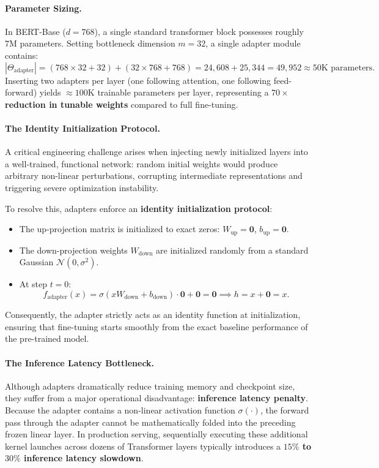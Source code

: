 \documentclass[../../../main.tex]{subfiles}
\begin{document}
\paragraph{Parameter Sizing.}
In BERT-Base ($d = 768$), a single standard transformer block possesses roughly $7\text{M}$ parameters. Setting bottleneck dimension $m = 32$, a single adapter module contains:
\begin{equation}
\label{eq:adapter_parameter_count}
|\Theta_{\text{adapter}}| = (768 \times 32 + 32) + (32 \times 768 + 768) = 24{,}608 + 25{,}344 = 49{,}952 \approx 50\text{K parameters}.
\end{equation}
Inserting two adapters per layer (one following attention, one following feed-forward) yields $\approx 100\text{K}$ trainable parameters per layer, representing a \textbf{$70\times$ reduction in tunable weights} compared to full fine-tuning.

\paragraph{The Identity Initialization Protocol.}
A critical engineering challenge arises when injecting newly initialized layers into a well-trained, functional network: random initial weights would produce arbitrary non-linear perturbations, corrupting intermediate representations and triggering severe optimization instability.

To resolve this, adapters enforce an \textbf{identity initialization protocol}:
\begin{itemize}
    \item The up-projection matrix is initialized to exact zeros: $W_{\text{up}} = \mathbf{0}$, $b_{\text{up}} = \mathbf{0}$.
    \item The down-projection weights $W_{\text{down}}$ are initialized randomly from a standard Gaussian $\mathcal{N}(0, \sigma^2)$.
    \item At step $t = 0$:
    \begin{equation}
    f_{\text{adapter}}(x) = \sigma(x W_{\text{down}} + b_{\text{down}}) \cdot \mathbf{0} + \mathbf{0} = \mathbf{0} \implies h = x + \mathbf{0} = x.
    \end{equation}
\end{itemize}
Consequently, the adapter strictly acts as an identity function at initialization, ensuring that fine-tuning starts smoothly from the exact baseline performance of the pre-trained model.

\paragraph{The Inference Latency Bottleneck.}
Although adapters dramatically reduce training memory and checkpoint size, they suffer from a major operational disadvantage: \textbf{inference latency penalty}. Because the adapter contains a non-linear activation function $\sigma(\cdot)$, the forward pass through the adapter cannot be mathematically folded into the preceding frozen linear layer. In production serving, sequentially executing these additional kernel launches across dozens of Transformer layers typically introduces a \textbf{$15\%$ to $30\%$ inference latency slowdown}.
\end{document}
